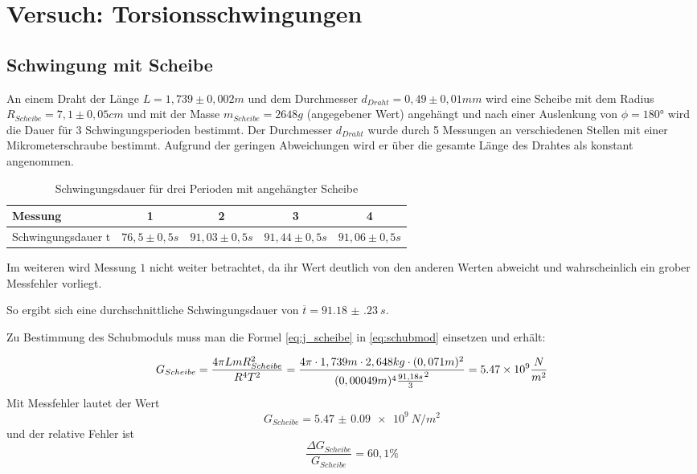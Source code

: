 \section{Versuch: Torsionsschwingungen}
\subsection{Schwingung mit Scheibe}
An einem Draht der Länge $L=1,739 \pm 0,002 m$ und dem Durchmesser $d_{Draht}= 0,49 \pm 0,01 mm$ wird eine Scheibe mit dem Radius $R_{Scheibe}= 7,1 \pm 0,05 cm$ und mit der Masse $m_{Scheibe}=2648g$ (angegebener Wert) angehängt und nach einer Auslenkung von $\phi =180$° wird die Dauer für 3 Schwingungsperioden bestimmt. Der Durchmesser $d_{Draht}$ wurde durch 5 Messungen an verschiedenen Stellen mit einer Mikrometerschraube bestimmt. Aufgrund der geringen Abweichungen wird er über die gesamte Länge des Drahtes als konstant angenommen.
\begin{table}[H]
  \centering
  \begin{tabular}{l | c | c | c | c}
    Messung & 1 & 2& 3 & 4 \\ \hline
    Schwingungsdauer t & $76,5 \pm 0,5 s $ & $91,03\pm 0,5 s $ & $91,44 \pm 0,5 s $ & $91,06\pm 0,5 s $
  \end{tabular}
  \caption{Schwingungsdauer für drei Perioden mit angehängter Scheibe}
  \label{tab:schwingdauerscheibe}
\end{table}
Im weiteren wird Messung $1$ nicht weiter betrachtet, da ihr Wert deutlich von den anderen Werten abweicht und wahrscheinlich ein grober Messfehler vorliegt.

So ergibt sich eine durchschnittliche  Schwingungsdauer von $\overline{t}=\SI{91.18(23)}{s}$.

Zu Bestimmung des Schubmoduls muss man die Formel \ref{eq:j_scheibe} in \ref{eq:schubmod} einsetzen und erhält:

\begin{equation}
G_{Scheibe}=\frac{4\pi LmR_{Scheibe}^2}{R^4T^2}= \frac{4\pi\cdot1,739m\cdot2,648kg\cdot(0,071m)^2}{(0,00049m)^4\frac{91,18s}{3}^2}=\num{5,47d9} \frac{N}{m^2}
\end{equation}
Mit Messfehler lautet der Wert
\begin{equation}
  G_{Scheibe}=\SI{5.47(9)e9}{N/m^2}
  \label{eq:schubmodulergebnis}
\end{equation}
und der relative Fehler ist
\begin{equation}
\frac{\Delta G_{Scheibe}}{G_{Scheibe}}=60,1\%
\end{equation}
